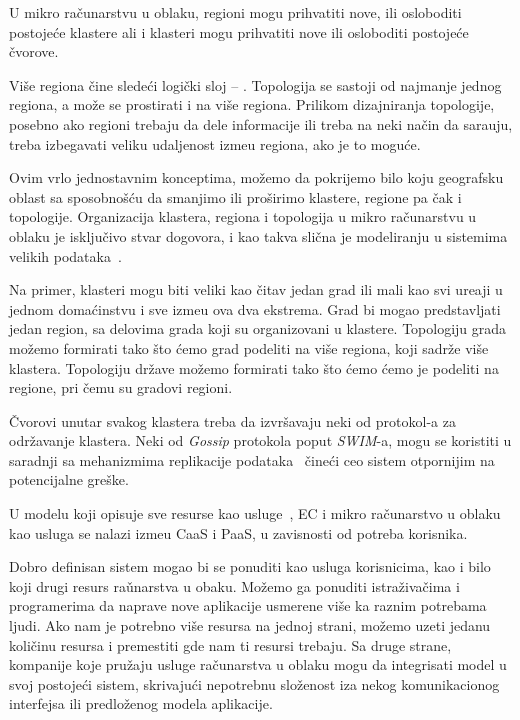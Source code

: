 U mikro ra\v cunarstvu u oblaku, regioni mogu prihvatiti nove, ili osloboditi postoje\'ce klastere ali i klasteri mogu prihvatiti nove ili osloboditi postoje\'ce \v cvorove.

Vi\v se regiona \v cine slede\'ci logi\v cki sloj -- . Topologija se sastoji od najmanje jednog regiona, a mo\v ze se prostirati i na vi\v se regiona. Prilikom dizajniranja topologije, posebno ako regioni trebaju da dele informacije ili treba na neki na\v cin da sara\dj uju, treba izbegavati veliku udaljenost izme\dj u regiona, ako je to mogu\'ce. 

Ovim vrlo jednostavnim konceptima, mo\v zemo da pokrijemo bilo koju geografsku oblast sa sposobno\v s\'cu da smanjimo ili pro\v sirimo klastere, regione pa \v cak i topologije. Organizacija klastera, regiona i topologija u mikro ra\v cunarstvu u oblaku je isklju\v civo stvar dogovora, i kao takva sli\v cna je modeliranju u sistemima velikih podataka~\cite {SonbolOAA20, WangCAL14}.

Na primer, klasteri mogu biti veliki kao \v citav jedan grad ili mali kao svi ure\dj aji u jednom doma\'cinstvu i sve izme\dj u ova dva ekstrema. Grad bi mogao predstavljati jedan region, sa delovima grada koji su organizovani u klastere. Topologiju grada mo\v zemo formirati tako što \'cemo grad podeliti na vi\v se regiona, koji sadr\v ze vi\v se klastera. Topologiju dr\v zave mo\v zemo formirati tako \v sto \'cemo \'cemo je podeliti na regione, pri \v cemu su gradovi regioni. 

\v Cvorovi unutar svakog klastera treba da izvr\v savaju neki od protokol-a za odr\v zavanje klastera. Neki od \textit{Gossip} protokola poput \textit{SWIM}-a\cite {DasGM02}, mogu se koristiti u saradnji sa mehanizmima replikacije podataka~\cite {LiBCL20, CauCBFCEB16, CRDTS_Nuno} \v cine\'ci ceo sistem otpornijim na potencijalne gre\v ske. 

U modelu koji opisuje sve resurse kao usluge~\cite {DuanFZSNH15}, EC i mikro ra\v cunarstvo u oblaku kao usluga se nalazi izme\dj u CaaS i PaaS, u zavisnosti od potreba korisnika.

Dobro definisan sistem mogao bi se ponuditi kao usluga korisnicima, kao i bilo koji drugi resurs ra\v unarstva u obaku. Mo\v zemo ga ponuditi istra\v ziva\v cima i programerima da naprave nove aplikacije usmerene vi\v se ka raznim potrebama ljudi. Ako nam je potrebno vi\v se resursa na jednoj strani, mo\v zemo uzeti jedanu koli\v cinu resursa i premestiti gde nam ti resursi trebaju. Sa druge strane, kompanije koje pru\v zaju usluge ra\v cunarstva u oblaku mogu da integrisati model u svoj postoje\'ci sistem, skrivaju\'ci nepotrebnu slo\v zenost iza nekog komunikacionog interfejsa ili predlo\v zenog modela aplikacije.

